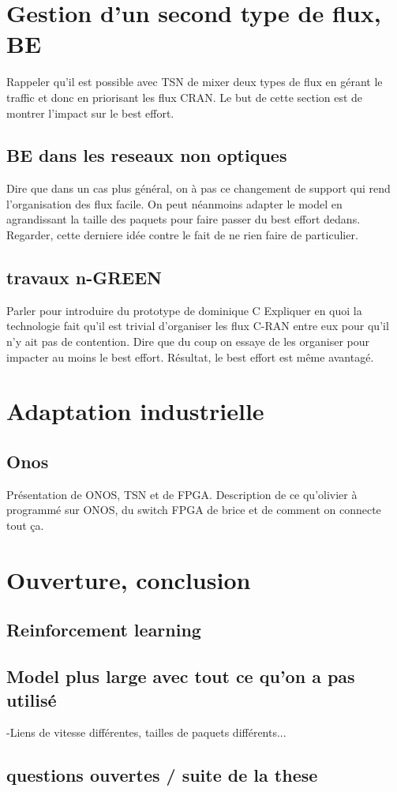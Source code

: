 \documentclass[a4paper,10pt]{article}
\begin{document}
\section{Gestion d'un second type de flux, BE}
Rappeler qu'il est possible avec TSN de mixer deux types de flux en gérant le traffic et donc en priorisant les flux CRAN. Le but de cette section est de montrer l'impact sur le best effort.

\subsection{BE dans les reseaux non optiques}
Dire que dans un cas plus général, on à pas ce changement de support qui rend l'organisation des flux facile. On peut néanmoins adapter le model en agrandissant la taille des paquets pour faire passer du best effort dedans. Regarder, cette derniere idée contre le fait de ne rien faire de particulier.
\subsection{travaux n-GREEN}
Parler pour introduire du prototype de dominique C
Expliquer en quoi la technologie fait qu'il est trivial d'organiser les flux C-RAN entre eux pour qu'il n'y ait pas de contention. 
Dire que du coup on essaye de les organiser pour impacter au moins le best effort. Résultat, le best effort est même avantagé.
\section{Adaptation industrielle}
\subsection{Onos}
Présentation de ONOS, TSN et de FPGA. Description de ce qu'olivier à programmé sur ONOS, du switch FPGA de brice et de comment on connecte tout ça. 

\section{Ouverture, conclusion}

\subsection{Reinforcement learning}
\subsection{Model plus large avec tout ce qu'on a pas utilisé}
-Liens de vitesse différentes, tailles de paquets différents...
\subsection{questions ouvertes / suite de la these}



\end{document}
